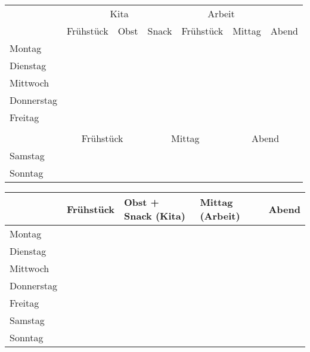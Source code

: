 \documentclass[a4paper,12pt]{article}
\begin{document}
\pagestyle{empty}

\centering

\begin{tabular}{l|p{3.2cm}|p{3.2cm}|p{3.2cm}||p{3.2cm}|p{3.2cm}||p{3.2cm}|}
  \toprule
  \multicolumn{1}{c|}{} & \multicolumn{3}{c||}{Kita} & \multicolumn{2}{c||}{Arbeit} & \\
                        & Frühstück & Obst & Snack & Frühstück & Mittag & Abend \\
  \midrule
  Montag                &           &      &       &           &        &       \\[1.3cm]
  \midrule
  Dienstag              &           &      &       &           &        &       \\[1.3cm]
  \midrule
  Mittwoch              &           &      &       &           &        &       \\[1.3cm]
  \midrule
  Donnerstag            &           &      &       &           &        &       \\[1.3cm]
  \midrule
  Freitag               &           &      &       &           &        &       \\[1.3cm]
  \bottomrule
  \multicolumn{7}{c}{} \\[0.5cm] %
  \toprule
          & \multicolumn{2}{c|}{Frühstück} & \multicolumn{2}{c|}{Mittag} & \multicolumn{2}{c|}{Abend} \\
  \midrule
  Samstag & \multicolumn{2}{c|}{}          & \multicolumn{2}{c|}{}       & \multicolumn{2}{c|}{}      \\[1.3cm]
  \midrule
  Sonntag & \multicolumn{2}{c|}{}          & \multicolumn{2}{c|}{}       & \multicolumn{2}{c|}{}      \\[1.3cm]
  \bottomrule
\end{tabular}

\begin{tabular}{l|p{5cm}|p{5cm}|p{5cm}|p{5cm}|}
  \toprule
             & Frühstück & Obst + Snack (Kita) & Mittag (Arbeit) & Abend \\
  \midrule
  Montag     &           &                     &                 &       \\[1.4cm]
  \midrule
  Dienstag   &           &                     &                 &       \\[1.4cm]
  \midrule
  Mittwoch   &           &                     &                 &       \\[1.4cm]
  \midrule
  Donnerstag &           &                     &                 &       \\[1.4cm]
  \midrule
  Freitag    &           &                     &                 &       \\[1.4cm]
  \midrule
  Samstag    &           &                     &                 &       \\[1.4cm]
  \midrule
  Sonntag    &           &                     &                 &       \\[1.4cm]
  \bottomrule
\end{tabular}
\end{document}
